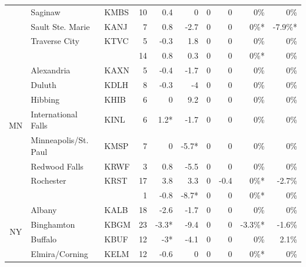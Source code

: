 \documentclass[twocol]{ametsoc}
\begin{document}
\begin{landscape}
\begin{table}[]
\begin{tabular}{@{}cllrrrrrrr@{}}
                     & Saginaw                    & KMBS & 10   & 0.4   & 0     & 0     & 0    & 0\%     & 0\%      \\
                     & Sault Ste. Marie           & KANJ & 7    & 0.8   & -2.7  & 0     & 0    & 0\%*    & -7.9\%*  \\
                     & Traverse City              & KTVC & 5    & -0.3  & 1.8   & 0     & 0    & 0\%     & 0\%      \\ \cmidrule(l){2-10} 
                     &                            &      & 14   & 0.8   & 0.3   & 0     & 0    & 0\%*    & 0\%      \\ \midrule
\multirow{7}{*}{MN}  & Alexandria                 & KAXN & 5    & -0.4  & -1.7  & 0     & 0    & 0\%     & 0\%      \\
                     & Duluth                     & KDLH & 8    & -0.3  & -4    & 0     & 0    & 0\%     & 0\%      \\
                     & Hibbing                    & KHIB & 6    & 0     & 9.2   & 0     & 0    & 0\%     & 0\%      \\
                     & International Falls        & KINL & 6    & 1.2*  & -1.7  & 0     & 0    & 0\%     & 0\%      \\
                     & Minneapolis/St. Paul       & KMSP & 7    & 0     & -5.7* & 0     & 0    & 0\%     & 0\%      \\
                     & Redwood Falls              & KRWF & 3    & 0.8   & -5.5  & 0     & 0    & 0\%     & 0\%      \\
                     & Rochester                  & KRST & 17   & 3.8   & 3.3   & 0     & -0.4 & 0\%*    & -2.7\%   \\ \cmidrule(l){2-10} 
                     &                            &      & 1    & -0.8  & -8.7* & 0     & 0    & 0\%*    & 0\%      \\ \midrule
\multirow{15}{*}{NY} & Albany                     & KALB & 18   & -2.6  & -1.7  & 0     & 0    & 0\%     & 0\%      \\
                     & Binghamton                 & KBGM & 23   & -3.3* & -9.4  & 0     & 0    & -3.3\%* & -1.6\%   \\
                     & Buffalo                    & KBUF & 12   & -3*   & -4.1  & 0     & 0    & 0\%     & 2.1\%    \\
                     & Elmira/Corning             & KELM & 12   & -0.6  & 0     & 0     & 0    & 0\%*    & 0\%      \\

\end{tabular}
\end{table}
\end{landscape}
\end{document}
